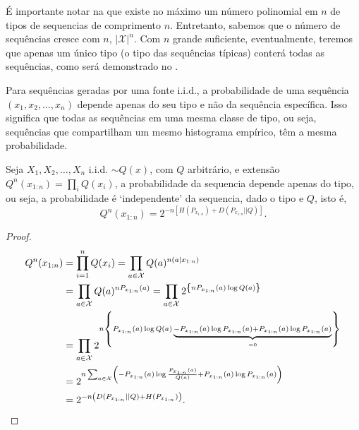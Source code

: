 É importante notar na  que existe no máximo um número polinomial em
$n$ de tipos de sequencias de comprimento $n$. Entretanto, sabemos que o número de sequências cresce com $n$,
$\vert \mathcal{X} \vert^n$. Com $n$ grande suficiente, eventualmente, teremos que apenas um único tipo
(o tipo das sequências típicas) conterá todas as sequências, como será demonstrado no .


Para sequências geradas por uma fonte i.i.d., a probabilidade de uma sequência
$(x_1, x_2, \ldots, x_n)$ depende apenas do seu tipo e não da sequência específica.
Isso significa que todas as sequências em uma mesma classe de tipo, ou seja,
sequências que compartilham um mesmo histograma empírico, têm a mesma probabilidade.

\begin{theorem}
Seja $X_1, X_2, \ldots, X_n$ i.i.d. $\sim Q(x)$, com $Q$ arbitrário, e extensão
$Q^n(x_{1:n}) = \prod_i Q(x_i)$, a probabilidade da sequencia depende apenas do tipo, ou seja,
a probabilidade é `independente' da sequencia, dado o tipo e $Q$, isto é,
\begin{equation}
Q^n(x_{1:n}) = 2^{-n[ H(P_{x_{1:n}}) + D(P_{x_{1:n}}||Q) ]} .
\end{equation}
\end{theorem}

\begin{proof}
\begin{subequations}
\begin{align}
  Q^n(x_{1:n}) &= \prod_{i=1}^{n} Q(x_i) = \prod_{a \in \mathcal{X}} Q(a)^{n(a \mid x_{1:n})} \\
        &= \prod_{a \in \mathcal{X}} Q(a)^{n P_{x_{1:n}}(a) } = \prod_{a \in \mathcal{X}} 2^{ \left\{ n P_{x_{1:n}}(a) \log Q(a) \right\} } \\
        &= \prod_{a \in \mathcal{X}} 2^{ n \left\{  P_{x_{1:n}}(a) \log Q(a) \KeepStyleUnderBrace{ -P_{x_{1:n}}(a) \log P_{x_{1:n}}(a) + P_{x_{1:n}}(a) \log P_{x_{1:n}}(a) }_{=0} \right\} } \\
        &= 2^{n \sum_{a \in \mathcal{X}}  \left( -P_{x_{1:n}}(a) \log \frac{P_{x_{1:n}}(a)}{Q(a)} + P_{x_{1:n}}(a) \log P_{x_{1:n}}(a) \right)  } \\
        &= 2^{-n \left( D(P_{x_{1:n}} \mid \mid Q) + H( P_{x_{1:n}} ) \right) } .
\end{align}
\end{subequations}
\end{proof}

